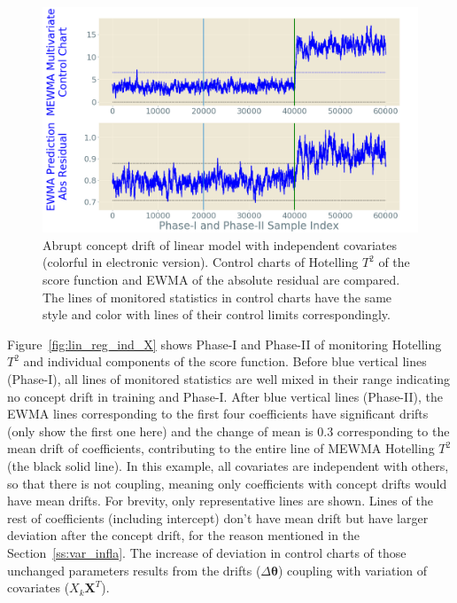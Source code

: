 \documentclass[twoside,11pt]{article}
\begin{document}
\begin{enumerate}[(I)]
\begin{figure}[!htp]
\centering
\includegraphics[width = 0.6\linewidth]{../figures/v14/sim_2/reg/3_sim2_lin_1e-08_0_005_1.png}
  \caption{Abrupt concept drift of linear model with independent covariates (colorful in electronic version). Control charts of Hotelling $T^2$ of the score function and EWMA of the absolute residual are compared. The lines of monitored statistics in control charts have the same style and color with lines of their control limits correspondingly.}
  \label{fig:lin_reg_ind_X_comp}
\end{figure}

Figure~\ref{fig:lin_reg_ind_X} shows Phase-I and Phase-II of monitoring Hotelling $T^2$ and individual components of the score function. Before blue vertical lines (Phase-I), all lines of monitored statistics are well mixed in their range indicating no concept drift in training and Phase-I. After blue vertical lines (Phase-II), the EWMA lines corresponding to the first four coefficients have significant drifts (only show the first one here) and the change of mean is $0.3$ corresponding to the mean drift of coefficients, contributing to the entire line of MEWMA Hotelling $T^2$ (the black solid line). In this example, all covariates are independent with others, so that there is not coupling, meaning only coefficients with concept drifts would have mean drifts. For brevity, only representative lines are shown. Lines of the rest of coefficients (including intercept) don't have mean drift but have larger deviation after the concept drift, for the reason mentioned in the Section~\ref{ss:var_infla}. The increase of deviation in control charts of those unchanged parameters results from the drifts ($\Delta \bm { \theta}$) coupling with variation of covariates ($X_k\bm {X}^T$).


\end{enumerate}
\end{document}
